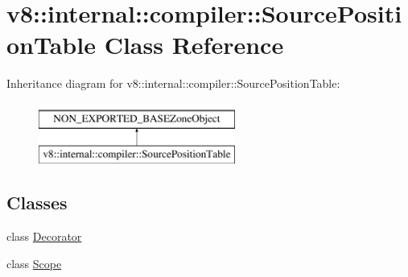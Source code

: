 \hypertarget{classv8_1_1internal_1_1compiler_1_1SourcePositionTable}{}\section{v8\+:\+:internal\+:\+:compiler\+:\+:Source\+Position\+Table Class Reference}
\label{classv8_1_1internal_1_1compiler_1_1SourcePositionTable}
Inheritance diagram for v8\+:\+:internal\+:\+:compiler\+:\+:Source\+Position\+Table\+:\begin{figure}[H]
\begin{center}
\leavevmode
\includegraphics[height=2.000000cm]{classv8_1_1internal_1_1compiler_1_1SourcePositionTable}
\end{center}
\end{figure}
\subsection*{Classes}
\begin{DoxyCompactItemize}
\item 
class \mbox{\hyperlink{classv8_1_1internal_1_1compiler_1_1SourcePositionTable_1_1Decorator}{Decorator}}
\item 
class \mbox{\hyperlink{classv8_1_1internal_1_1compiler_1_1SourcePositionTable_1_1Scope}{Scope}}
\end{DoxyCompactItemize}
